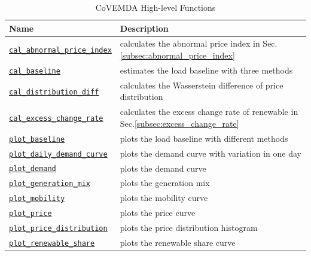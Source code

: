 \documentclass[10pt]{article}
\newcommand{\covemda}{CoVEMDA}
\numberwithin{equation}{section}
\numberwithin{table}{section}
\numberwithin{figure}{section}
\begin{document}
\begin{appendices}
\begin{table}[!ht]
    \centering
    \begin{threeparttable}
    \caption{\covemda{} High-level Functions}
    \label{tab:high_level_func}
    \footnotesize
    \begin{tabular}{ll}
        \toprule
        Name & Description \\
        \midrule
        \hyperref[func:cal_abnormal_price_index]{\texttt{cal\_abnormal\_price\_index}} & calculates the abnormal price index in Sec.\ref{subsec:abnormal_price_index} \\
        \hyperref[func:cal_baseline]{\texttt{cal\_baseline}} & estimates the load baseline with three methods \\
        \hyperref[func:cal_distribution_diff]{\texttt{cal\_distribution\_diff}} & calculates the Wasserstein difference of price distribution \\
        \hyperref[func:cal_excess_change_rate]{\texttt{cal\_excess\_change\_rate}} & calculates the excess change rate of renewable in Sec.\ref{subsec:excess_change_rate} \\
        \hyperref[func:plot_baseline]{\texttt{plot\_baseline}} & plots the load baseline with different methods \\
        \hyperref[func:plot_daily_demand_curve]{\texttt{plot\_daily\_demand\_curve}} & plots the demand curve with variation in one day \\
        \hyperref[func:plot_demand]{\texttt{plot\_demand}} & plots the demand curve \\
        \hyperref[func:plot_generation_mix]{\texttt{plot\_generation\_mix}} & plots the generation mix \\
        \hyperref[func:plot_mobility]{\texttt{plot\_mobility}} & plots the mobility curve \\
        \hyperref[func:plot_price]{\texttt{plot\_price}} & plots the price curve \\
        \hyperref[func:plot_price_distribution]{\texttt{plot\_price\_distribution}} & plots the price distribution histogram \\
        \hyperref[func:plot_renewable_share]{\texttt{plot\_renewable\_share}} & plots the renewable share curve \\
        \bottomrule
    \end{tabular}
    \end{threeparttable}
\end{table}


\end{appendices}
\end{document}

